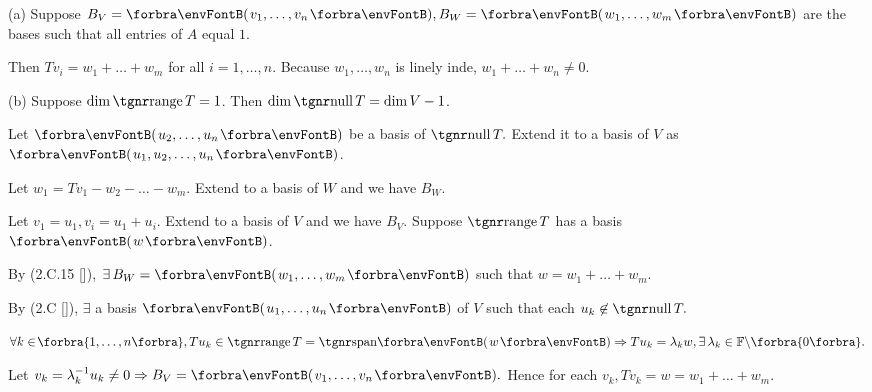 \par\quad
(a) Suppose $B_V=\Par{v_1,\dots,v_n},B_W=\Par{w_1,\dots,w_m}$ are the bases such that all entries of $A$ equal $1$.\vspace{6pt}\par\quad\Ha
Then $Tv_i=w_1+\dots+w_m$ for all $i=1,\dots,n$. Because $w_1,\dots,w_n$ is linely inde, $w_1+\dots+w_n\neq 0.$\par\quad
(b) Suppose $\dim\range T=1$. Then $\dim\null T=\dim V-1$.\par\quad\Hb
Let $\Par{u_2,\dots,u_n}$ be a basis of $\null T.$ Extend it to a basis of $V$ as $\Par{u_1,u_2,\dots,u_n}$.\par\quad\Hb
Let $w_1=Tv_1-w_2-\dots-w_m.$ Extend to a basis of $W$ and we have $B_W$.\par\quad\Hb
Let $v_1=u_1,v_i=u_1+u_i.$ Extend to a basis of $V$ and we have $B_V.$\PfEnd\vspace{10pt}\quad\Hb
\Or Suppose $\range T$ has a basis $\Par{w}$.\par\quad\Hb
By (2.C.15 [\COROLLARY]), $\exists\,B_W=\Par{w_1,\dots,w_m}$ such that $w=w_1+\dots+w_m.$\par\quad\Hb
By (2.C [\NEWTHEOREM]), $\exists$ a basis $\Par{u_1,\dots,u_n}$ of $V$ such that each $u_k\not\in\null T.$\par\quad\Hb
$\forall k\in\!\Bra{1,\dots,n},Tu_k\in\range T=\Span{w}\Rightarrow Tu_k=\lambda_k w,\exists\,\lambda_k\in\Fbb\backslash\zeroSubs.$\par\quad\Hb
Let $v_k=\lambda_k^{-1}u_k\neq 0\Rightarrow B_V=\Par{v_1,\dots,v_n}.$ Hence for each $v_k,Tv_k=w=w_1+\dots+w_m.$\PfEnd
\SepLine

\pagebreak


